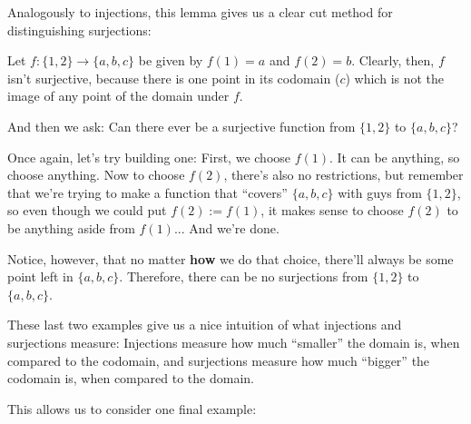 Analogously to injections, this lemma gives us a clear cut method for distinguishing surjections:

\begin{ex}
	Let $f:\{1,2\}\to\{a,b,c\}$ be given by $f(1)=a$ and $f(2)=b$. Clearly, then, $f$ isn't surjective, because there is one point in its codomain ($c$) which is not the image of any point of the domain under $f$.
	
	\bigskip
	And then we ask: Can there ever be a surjective function from $\{1,2\}$ to $\{a,b,c\}$?
	
	Once again, let's try building one: First, we choose $f(1)$. It can be anything, so choose anything. Now to choose $f(2)$, there's also no restrictions, but remember that we're trying to make a function that ``covers'' $\{a,b,c\}$ with guys from $\{1,2\}$, so even though we could put $f(2):=f(1)$, it makes sense to choose $f(2)$ to be anything aside from $f(1)$... And we're done. 
	
	Notice, however, that no matter \textbf{how} we do that choice, there'll always be some point left in $\{a,b,c\}$. Therefore, there can be no surjections from $\{1,2\}$ to $\{a,b,c\}$.
\end{ex}

These last two examples give us a nice intuition of what injections and surjections measure: Injections measure how much ``smaller'' the domain is, when compared to the codomain, and surjections measure how much ``bigger'' the codomain is, when compared to the domain.

This allows us to consider one final example:

